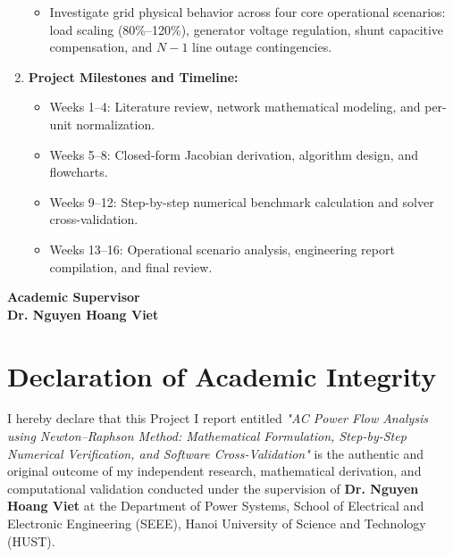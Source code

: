 \documentclass[12pt,a4paper,oneside]{report}
\begin{document}
\begin{spacing}{1.15}
\begin{enumerate}
\begin{itemize}
        \item Investigate grid physical behavior across four core operational scenarios: load scaling (80\%--120\%), generator voltage regulation, shunt capacitive compensation, and $N-1$ line outage contingencies.
    \end{itemize}
    \item \textbf{Project Milestones and Timeline:}
    \begin{itemize}\setlength{\itemsep}{0.5pt}\setlength{\parskip}{0pt}
        \item Weeks 1--4: Literature review, network mathematical modeling, and per-unit normalization.
        \item Weeks 5--8: Closed-form Jacobian derivation, algorithm design, and flowcharts.
        \item Weeks 9--12: Step-by-step numerical benchmark calculation and solver cross-validation.
        \item Weeks 13--16: Operational scenario analysis, engineering report compilation, and final review.
    \end{itemize}
\end{enumerate}

\vspace{25pt}
\begin{flushright}
\begin{minipage}[t]{0.5\textwidth}
    \centering
    \textbf{Academic Supervisor}\\[45pt]
    \textbf{Dr. Nguyen Hoang Viet}
\end{minipage}
\end{flushright}
\end{spacing}

\clearpage

\chapter*{Declaration of Academic Integrity}

I hereby declare that this Project I report entitled \textit{"AC Power Flow Analysis using Newton--Raphson Method: Mathematical Formulation, Step-by-Step Numerical Verification, and Software Cross-Validation"} is the authentic and original outcome of my independent research, mathematical derivation, and computational validation conducted under the supervision of \textbf{Dr. Nguyen Hoang Viet} at the Department of Power Systems, School of Electrical and Electronic Engineering (SEEE), Hanoi University of Science and Technology (HUST).
\end{document}
